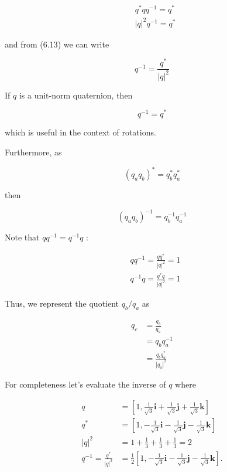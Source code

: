     $$
        \begin{aligned}
             & q^{*} q q^{-1}=q^{*} \\
             & |q|^{2} q^{-1}=q^{*}
        \end{aligned}
    $$

    and from (6.13) we can write

    $$
        q^{-1}=\frac{q^{*}}{|q|^{2}}
    $$

    If $q$ is a unit-norm quaternion, then

    $$
        q^{-1}=q^{*}
    $$

    which is useful in the context of rotations.

    Furthermore, as

    $$
        \left(q_{a} q_{b}\right)^{*}=q_{b}^{*} q_{a}^{*}
    $$

    then

    $$
        \left(q_{a} q_{b}\right)^{-1}=q_{b}^{-1} q_{a}^{-1}
    $$

    Note that $q q^{-1}=q^{-1} q$ :

    $$
        \begin{aligned}
             & q q^{-1}=\frac{q q^{*}}{|q|^{2}}=1 \\
             & q^{-1} q=\frac{q^{*} q}{|q|^{2}}=1
        \end{aligned}
    $$

    Thus, we represent the quotient $q_{b} / q_{a}$ as

    $$
        \begin{aligned}
            q_{c} & =\frac{q_{b}}{q_{a}}                            \\
                  & =q_{b} q_{a}^{-1}                               \\
                  & =\frac{q_{b} q_{a}^{*}}{\left|q_{a}\right|^{2}}
        \end{aligned}
    $$

    For completeness let's evaluate the inverse of $q$ where

    $$
        \begin{aligned}
            q                            & =\left[1, \frac{1}{\sqrt{3}} \mathbf{i}+\frac{1}{\sqrt{3}} \mathbf{j}+\frac{1}{\sqrt{3}} \mathbf{k}\right]              \\
            q^{*}                        & =\left[1,-\frac{1}{\sqrt{3}} \mathbf{i}-\frac{1}{\sqrt{3}} \mathbf{j}-\frac{1}{\sqrt{3}} \mathbf{k}\right]              \\
            |q|^{2}                      & =1+\frac{1}{3}+\frac{1}{3}+\frac{1}{3}=2                                                                                \\
            q^{-1}=\frac{q^{*}}{|q|^{2}} & =\frac{1}{2}\left[1,-\frac{1}{\sqrt{3}} \mathbf{i}-\frac{1}{\sqrt{3}} \mathbf{j}-\frac{1}{\sqrt{3}} \mathbf{k}\right] .
        \end{aligned}
    $$

